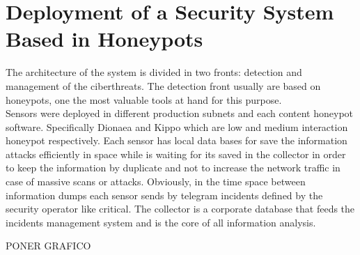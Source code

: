\documentclass[a4paper]{llncs}
\begin{document}
\section{Deployment of a Security System Based in Honeypots}
The architecture of the system is divided in two fronts: detection and management of the ciberthreats. The detection front usually are based on honeypots, one the most valuable tools at hand for this purpose.\\
Sensors were deployed in different production subnets and each content honeypot software. Specifically Dionaea\cite{dionaea} and Kippo\cite{kippo} which are low and medium interaction honeypot respectively. 
Each sensor has local data bases for save the information
 attacks efficiently in space 
 while is waiting 
 for its saved 
 in the collector in order to keep the information by duplicate and not to increase the network traffic in case of massive scans or attacks. Obviously, in the time space 
 between information dumps each sensor sends by telegram incidents
  defined by the security operator like critical. The collector is a corporate database that feeds the incidents management system 
  and is 
  the core of all information analysis.

PONER GRAFICO
\end{document}
